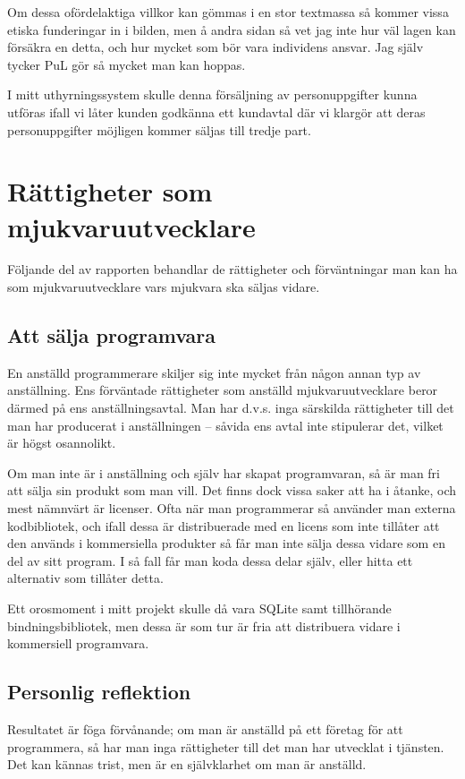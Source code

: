 \documentclass[12pt]{article}
\begin{document}
	Om dessa ofördelaktiga villkor kan gömmas i en stor textmassa så kommer vissa etiska funderingar in i bilden, men å andra sidan så vet jag inte hur väl lagen kan försäkra en detta, och hur mycket som bör vara individens ansvar. Jag själv tycker PuL gör så mycket man kan hoppas. 
	
	I mitt uthyrningssystem skulle denna försäljning av personuppgifter kunna utföras ifall vi låter kunden godkänna ett kundavtal där vi klargör att deras personuppgifter möjligen kommer säljas till tredje part.\cite{samtycke}
	
	\section{Rättigheter som mjukvaruutvecklare}
	Följande del av rapporten behandlar de rättigheter och förväntningar man kan ha som mjukvaruutvecklare vars mjukvara ska säljas vidare.
	\subsection{Att sälja programvara}
	En anställd programmerare skiljer sig inte mycket från någon annan typ av anställning. Ens förväntade rättigheter som anställd mjukvaruutvecklare beror därmed på ens anställningsavtal. Man har d.v.s. inga särskilda rättigheter till det man har producerat i anställningen -- såvida ens avtal inte stipulerar det, vilket är högst osannolikt. 

	Om man inte är i anställning och själv har skapat programvaran, så är man fri att sälja sin produkt som man vill. Det finns dock vissa saker att ha i åtanke, och mest nämnvärt är licenser. Ofta när man programmerar så använder man externa kodbibliotek, och ifall dessa är distribuerade med en licens som inte tillåter att den används i kommersiella produkter så får man inte sälja dessa vidare som en del av sitt program. I så fall får man koda dessa delar själv, eller hitta ett alternativ som tillåter detta. 

	Ett orosmoment i mitt projekt skulle då vara SQLite samt tillhörande bindningsbibliotek, men dessa är som tur är fria att distribuera vidare i kommersiell programvara.

	\subsection{Personlig reflektion}
	Resultatet är föga förvånande; om man är anställd på ett företag för att programmera, så har man inga rättigheter till det man har utvecklat i tjänsten. Det kan kännas trist, men är en självklarhet om man är anställd.
	
\end{document}
